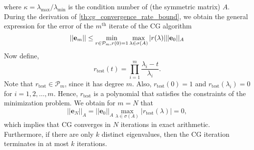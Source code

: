 where $\kappa = \lambda_{\text{max}}/\lambda_{\text{min}}$ is the condition number of (the symmetric matrix) $A$. 
During the derivation of \cref{th:cg_convergence_rate_bound}, we obtain the general expression for the error of the $m^{\text{th}}$ iterate of the CG algorithm
\[
  ||\mathbf{e}_m|| \leq \min_{r \in \mathcal{P}_{m}, r(0) = 1} \max_{\lambda \in \sigma(A)} |r(\lambda)| ||\mathbf{e}_0||_A \\
\]
Now define,
\[
  r_{\textrm{test}}(t) = \prod_{i=1}^m \frac{\lambda_i - t}{\lambda_i}.
\]
Note that $r_{\textrm{test}}\in\mathcal{P}_m$, since it has degree $m$. Also, $r_{\textrm{test}}(0) = 1$ and $r_{\textrm{test}}(\lambda_i) = 0$ for $i = 1, 2, \dots, m$. Hence, $r_{\textrm{test}}$ is a polynomial that satisfies the constraints of the minimization problem. We obtain for $m = N$ that
\[
  ||\mathbf{e}_N||_A = ||\mathbf{e}_0||_A \max_{\lambda \in \sigma(A)} |r_{\textrm{test}}(\lambda)| = 0,
\]
which implies that CG converges in $N$ iterations in exact arithmetic. Furthermore, if there are only $k$ distinct eigenvalues, then the CG iteration terminates in at most $k$ iterations.

